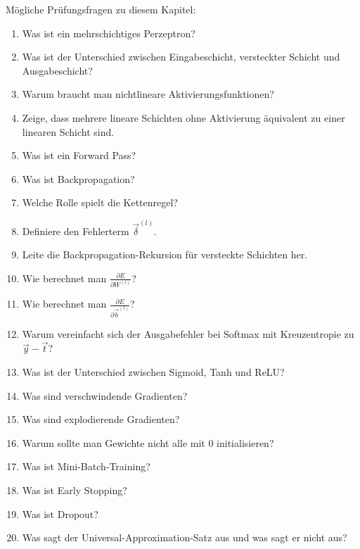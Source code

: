 \begin{examtipbox}
Mögliche Prüfungsfragen zu diesem Kapitel:

\begin{enumerate}
    \item Was ist ein mehrschichtiges Perzeptron?
    \item Was ist der Unterschied zwischen Eingabeschicht, versteckter Schicht und Ausgabeschicht?
    \item Warum braucht man nichtlineare Aktivierungsfunktionen?
    \item Zeige, dass mehrere lineare Schichten ohne Aktivierung äquivalent zu einer linearen Schicht sind.
    \item Was ist ein Forward Pass?
    \item Was ist Backpropagation?
    \item Welche Rolle spielt die Kettenregel?
    \item Definiere den Fehlerterm \(\vec{\delta}^{(l)}\).
    \item Leite die Backpropagation-Rekursion für versteckte Schichten her.
    \item Wie berechnet man \(\frac{\partial E}{\partial W^{(l)}}\)?
    \item Wie berechnet man \(\frac{\partial E}{\partial \vec{b}^{(l)}}\)?
    \item Warum vereinfacht sich der Ausgabefehler bei Softmax mit Kreuzentropie zu \(\vec{y}-\vec{t}\)?
    \item Was ist der Unterschied zwischen Sigmoid, Tanh und ReLU?
    \item Was sind verschwindende Gradienten?
    \item Was sind explodierende Gradienten?
    \item Warum sollte man Gewichte nicht alle mit \(0\) initialisieren?
    \item Was ist Mini-Batch-Training?
    \item Was ist Early Stopping?
    \item Was ist Dropout?
    \item Was sagt der Universal-Approximation-Satz aus und was sagt er nicht aus?
\end{enumerate}
\end{examtipbox}